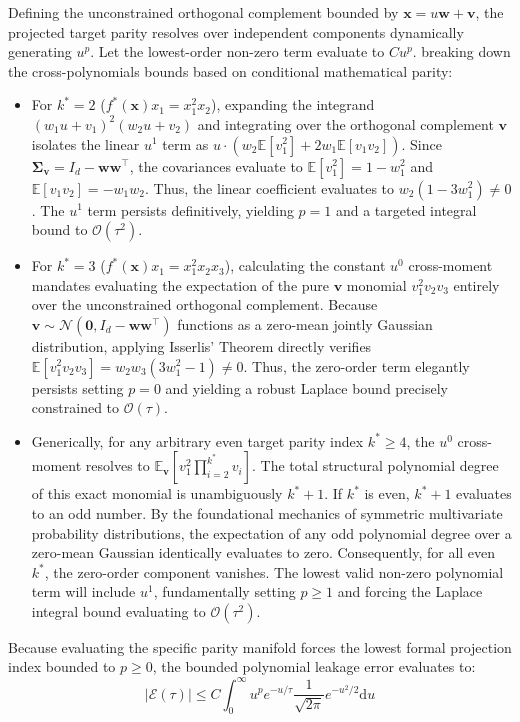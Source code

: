 \documentclass{article}
\newcommand{\E}{\mathbb{E}}
\newcommand{\1}{\mathbb{I}}
\newcommand{\diff}{\mathrm{d}}
\newcommand{\calO}{\mathcal{O}}
\newcommand{\bx}{\mathbf{x}}
\newcommand{\bw}{\mathbf{w}}
\newcommand{\bv}{\mathbf{v}}
\newcommand{\bSigma}{\boldsymbol{\Sigma}}
\newcommand{\calN}{\mathcal{N}}
\begin{document}
Defining the unconstrained orthogonal complement bounded by $\bx = u\bw + \bv$, the projected target parity resolves over independent components dynamically generating $u^p$. Let the lowest-order non-zero term evaluate to $C u^p$. breaking down the cross-polynomials bounds based on conditional mathematical parity:
\begin{itemize}[leftmargin=2em]
    \item For $k^*=2$ ($f^*(\bx) x_1 = x_1^2 x_2$), expanding the integrand $(w_1 u + v_1)^2 (w_2 u + v_2)$ and integrating over the orthogonal complement $\bv$ isolates the linear $u^1$ term as $u \cdot (w_2 \E[v_1^2] + 2 w_1 \E[v_1 v_2])$. Since $\bSigma_{\bv} = I_d - \bw\bw^\top$, the covariances evaluate to $\E[v_1^2] = 1-w_1^2$ and $\E[v_1 v_2] = -w_1 w_2$. Thus, the linear coefficient evaluates to $w_2(1-3w_1^2) \neq 0$. The $u^1$ term persists definitively, yielding $p=1$ and a targeted integral bound to $\calO(\tau^2)$.
    \item For $k^* = 3$ ($f^*(\bx) x_1 = x_1^2 x_2 x_3$), calculating the constant $u^0$ cross-moment mandates evaluating the expectation of the pure $\bv$ monomial $v_1^2 v_2 v_3$ entirely over the unconstrained orthogonal complement. Because $\bv \sim \calN(\mathbf{0}, I_d - \bw\bw^\top)$ functions as a zero-mean jointly Gaussian distribution, applying Isserlis' Theorem directly verifies $\E[v_1^2 v_2 v_3] = w_2 w_3(3w_1^2 - 1) \neq 0$. Thus, the zero-order term elegantly persists setting $p=0$ and yielding a robust Laplace bound precisely constrained to $\calO(\tau)$.
    \item Generically, for any arbitrary even target parity index $k^* \ge 4$, the $u^0$ cross-moment resolves to $\E_\bv[v_1^2 \prod_{i=2}^{k^*} v_i]$. The total structural polynomial degree of this exact monomial is unambiguously $k^*+1$. If $k^*$ is even, $k^*+1$ evaluates to an odd number. By the foundational mechanics of symmetric multivariate probability distributions, the expectation of any odd polynomial degree over a zero-mean Gaussian identically evaluates to zero. Consequently, for all even $k^*$, the zero-order component vanishes. The lowest valid non-zero polynomial term will include $u^1$, fundamentally setting $p \ge 1$ and forcing the Laplace integral bound evaluating to $\calO(\tau^2)$.
\end{itemize}
Because evaluating the specific parity manifold forces the lowest formal projection index bounded to $p \ge 0$, the bounded polynomial leakage error evaluates to:
\begin{equation}
    |\mathcal{E}(\tau)| \le C \int_{0}^\infty u^p e^{-u/\tau} \frac{1}{\sqrt{2\pi}} e^{-u^2/2} \diff u
\end{equation}
\end{document}
